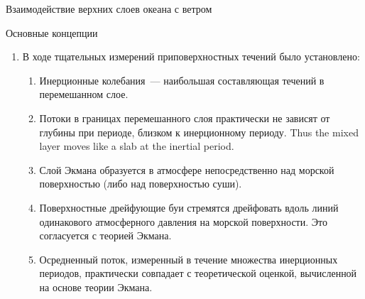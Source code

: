 \begin{chapter}{Взаимодействие верхних слоев океана с ветром}
\begin{section}{Основные концепции}
\begin{enumerate}
\begin{enumerate}
\item 
\textit{Скорость поверхностного течения}: $1$--$2.5\%$~скорости ветра 
в зависимости от широты.
%

\item 
\textit{Глубина}: приблизительно~$40$--$300\m$ в зависимости от широты
и скорости ветра.
%
\end{enumerate}

\item 
В ходе тщательных измерений приповерхностных течений было установлено:
%
%
  \begin{enumerate}
   \item 
    Инерционные колебания~--- наибольшая составляющая течений
    в перемешанном слое.
%

   \item Потоки в границах перемешанного 
    слоя практически не зависят 
    от глубины при периоде, близком к инерционному 
    периоду. Thus the mixed layer moves
    like a slab at the inertial period.
%

   \item Слой Экмана образуется в атмосфере непосредственно над морской 
    поверхностью (либо над поверхностью суши).
%

   \item Поверхностные дрейфующие буи 
    стремятся дрейфовать вдоль линий одинакового атмосферного давления
    на морской поверхности. Это согласуется с теорией Экмана.
%

   \item Осредненный поток, измеренный в течение множества инерционных периодов,
    практически совпадает с теоретической оценкой, вычисленной на основе
    теории Экмана.
%
\end{enumerate}


\end{enumerate}
\end{section}
\end{chapter}
